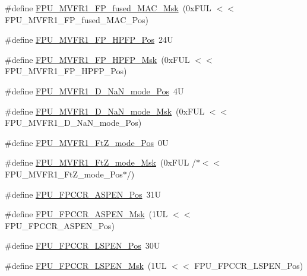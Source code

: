 \begin{DoxyCompactItemize}
\item 
\#define \hyperlink{group___c_m_s_i_s___f_p_u_gaf5129ab18948ff573a1ab29f0be47bc2}{F\+P\+U\+\_\+\+M\+V\+F\+R1\+\_\+\+F\+P\+\_\+fused\+\_\+\+M\+A\+C\+\_\+\+Msk}~(0x\+F\+U\+L $<$$<$ F\+P\+U\+\_\+\+M\+V\+F\+R1\+\_\+\+F\+P\+\_\+fused\+\_\+\+M\+A\+C\+\_\+\+Pos)
\item 
\#define \hyperlink{group___c_m_s_i_s___f_p_u_ga02ceac0abcbdc8670633056bec005bfd}{F\+P\+U\+\_\+\+M\+V\+F\+R1\+\_\+\+F\+P\+\_\+\+H\+P\+F\+P\+\_\+\+Pos}~24U
\item 
\#define \hyperlink{group___c_m_s_i_s___f_p_u_gafe29dd327ed3b723b3f01759568e116d}{F\+P\+U\+\_\+\+M\+V\+F\+R1\+\_\+\+F\+P\+\_\+\+H\+P\+F\+P\+\_\+\+Msk}~(0x\+F\+U\+L $<$$<$ F\+P\+U\+\_\+\+M\+V\+F\+R1\+\_\+\+F\+P\+\_\+\+H\+P\+F\+P\+\_\+\+Pos)
\item 
\#define \hyperlink{group___c_m_s_i_s___f_p_u_gae34d7ce42e50e2f1ea3e654fd3ba690a}{F\+P\+U\+\_\+\+M\+V\+F\+R1\+\_\+\+D\+\_\+\+Na\+N\+\_\+mode\+\_\+\+Pos}~4U
\item 
\#define \hyperlink{group___c_m_s_i_s___f_p_u_gad6af7c4632dba5a417307d456fe9b8a7}{F\+P\+U\+\_\+\+M\+V\+F\+R1\+\_\+\+D\+\_\+\+Na\+N\+\_\+mode\+\_\+\+Msk}~(0x\+F\+U\+L $<$$<$ F\+P\+U\+\_\+\+M\+V\+F\+R1\+\_\+\+D\+\_\+\+Na\+N\+\_\+mode\+\_\+\+Pos)
\item 
\#define \hyperlink{group___c_m_s_i_s___f_p_u_ga7faa5bfa85036f8511793234cbbc2409}{F\+P\+U\+\_\+\+M\+V\+F\+R1\+\_\+\+Ft\+Z\+\_\+mode\+\_\+\+Pos}~0U
\item 
\#define \hyperlink{group___c_m_s_i_s___f_p_u_gac566bde39a7afcceffbb21d830c269c1}{F\+P\+U\+\_\+\+M\+V\+F\+R1\+\_\+\+Ft\+Z\+\_\+mode\+\_\+\+Msk}~(0x\+F\+U\+L /$\ast$$<$$<$ F\+P\+U\+\_\+\+M\+V\+F\+R1\+\_\+\+Ft\+Z\+\_\+mode\+\_\+\+Pos$\ast$/)
\item 
\#define \hyperlink{group___c_m_s_i_s___f_p_u_ga4228a923ddf665f868e56b4b9e9bff7b}{F\+P\+U\+\_\+\+F\+P\+C\+C\+R\+\_\+\+A\+S\+P\+E\+N\+\_\+\+Pos}~31U
\item 
\#define \hyperlink{group___c_m_s_i_s___f_p_u_ga309886ff6bbd25cb13c061c6683c6c0c}{F\+P\+U\+\_\+\+F\+P\+C\+C\+R\+\_\+\+A\+S\+P\+E\+N\+\_\+\+Msk}~(1\+U\+L $<$$<$ F\+P\+U\+\_\+\+F\+P\+C\+C\+R\+\_\+\+A\+S\+P\+E\+N\+\_\+\+Pos)
\item 
\#define \hyperlink{group___c_m_s_i_s___f_p_u_gac7d70e051fe759ad8fed83bf5b5aebc1}{F\+P\+U\+\_\+\+F\+P\+C\+C\+R\+\_\+\+L\+S\+P\+E\+N\+\_\+\+Pos}~30U
\item 
\#define \hyperlink{group___c_m_s_i_s___f_p_u_gaf4ab19de45df6522dd882bc116f938e9}{F\+P\+U\+\_\+\+F\+P\+C\+C\+R\+\_\+\+L\+S\+P\+E\+N\+\_\+\+Msk}~(1\+U\+L $<$$<$ F\+P\+U\+\_\+\+F\+P\+C\+C\+R\+\_\+\+L\+S\+P\+E\+N\+\_\+\+Pos)
$$
\end{DoxyCompactItemize}
